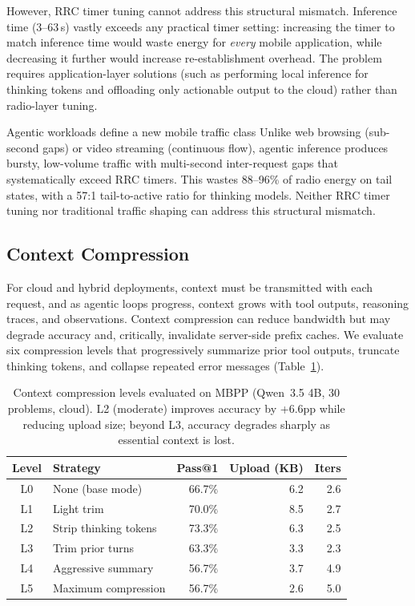 \documentclass[sigconf,anonymous,review]{acmart}
\begin{document}
However, RRC timer tuning cannot address this structural mismatch. Inference time (3--63\,s) vastly exceeds any practical timer setting: increasing the timer to match inference time would waste energy for \emph{every} mobile application, while decreasing it further would increase re-establishment overhead. The problem requires application-layer solutions (such as performing local inference for thinking tokens and offloading only actionable output to the cloud) rather than radio-layer tuning.

\begin{insightbox}{Agentic workloads define a new mobile traffic class}
Unlike web browsing (sub-second gaps) or video streaming (continuous flow), agentic inference produces bursty, low-volume traffic with multi-second inter-request gaps that systematically exceed RRC timers.
This wastes 88--96\% of radio energy on tail states, with a 57:1 tail-to-active ratio for thinking models.
Neither RRC timer tuning nor traditional traffic shaping can address this structural mismatch.
\end{insightbox}

\subsection{Context Compression}
\label{sec:compression}

For cloud and hybrid deployments, context must be transmitted with each request, and as agentic loops progress, context grows with tool outputs, reasoning traces, and observations. Context compression can reduce bandwidth but may degrade accuracy and, critically, invalidate server-side prefix caches. We evaluate six compression levels that progressively summarize prior tool outputs, truncate thinking tokens, and collapse repeated error messages (Table~\ref{tab:compression}).

\begin{table}[t]
\centering
\caption{Context compression levels evaluated on MBPP (Qwen~3.5 4B, 30 problems, cloud). L2 (moderate) improves accuracy by +6.6pp while reducing upload size; beyond L3, accuracy degrades sharply as essential context is lost.}
\label{tab:compression}
\small
\begin{tabular}{@{} c l r r r @{}}
\toprule
\textbf{Level} & \textbf{Strategy} & \textbf{Pass@1} & \textbf{Upload (KB)} & \textbf{Iters} \\
\midrule
L0 & None (base mode)       & 66.7\% & 6.2 & 2.6 \\
L1 & Light trim             & 70.0\% & 8.5 & 2.7 \\
L2 & Strip thinking tokens  & 73.3\% & 6.3 & 2.5 \\
L3 & Trim prior turns       & 63.3\% & 3.3 & 2.3 \\
L4 & Aggressive summary     & 56.7\% & 3.7 & 4.9 \\
L5 & Maximum compression    & 56.7\% & 2.6 & 5.0 \\
\bottomrule
\end{tabular}
\end{table}
\end{document}
